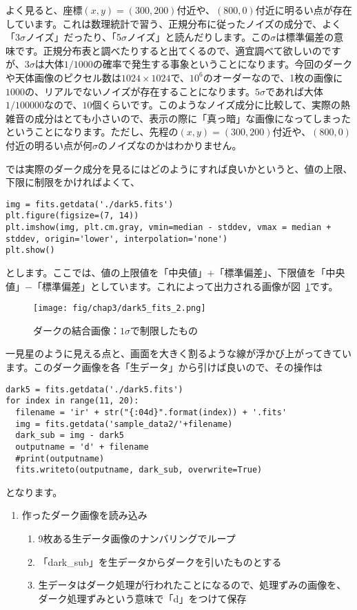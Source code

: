 よく見ると、座標$(x,y)=(300,200)$付近や、$(800,0)$付近に明るい点が存在しています。これは数理統計で習う、正規分布に従ったノイズの成分で、よく「3$\sigma$ノイズ」だったり、「5$\sigma$ノイズ」と読んだりします。この$\sigma$は標準偏差の意味です。正規分布表と調べたりすると出てくるので、適宜調べて欲しいのですが、3$\sigma$は大体$1/1000$の確率で発生する事象ということになります。今回のダークや天体画像のピクセル数は$1024\times1024$で、$10^{6}$のオーダーなので、1枚の画像に$1000$の、リアルでないノイズが存在することになります。$5\sigma$であれば大体$1/100000$なので、$10$個くらいです。このようなノイズ成分に比較して、実際の熱雑音の成分はとても小さいので、表示の際に「真っ暗」な画像になってしまったということになります。ただし、先程の$(x,y)=(300,200)$付近や、$(800,0)$付近の明るい点が何$\sigma$のノイズなのかはわかりません。

では実際のダーク成分を見るにはどのようにすれば良いかというと、値の上限、下限に制限をかければよくて、
\begin{lstlisting}[caption=実際のダーク画像の出力,label=code_3_3_4]
img = fits.getdata('./dark5.fits')
plt.figure(figsize=(7, 14))
plt.imshow(img, plt.cm.gray, vmin=median - stddev, vmax = median + stddev, origin='lower', interpolation='none')
plt.show()
\end{lstlisting}
とします。ここでは、値の上限値を「中央値」$+$「標準偏差」、下限値を「中央値」$-$「標準偏差」としています。これによって出力される画像が図~\ref{fig_3_2}です。
\begin{figure}
  \centering
	\texttt{[image: fig/chap3/dark5\_fits\_2.png]}
	\caption[ダークの結合画像：$1\sigma$で制限したもの]{ダークの結合画像：$1\sigma$で制限したもの\label{fig_3_2}}
\end{figure}

一見星のように見える点と、画面を大きく割るような線が浮かび上がってきています。このダーク画像を各「生データ」から引けば良いので、その操作は
\begin{lstlisting}[caption=生データからダークを引く処理,label=code_3_3_5]
dark5 = fits.getdata('./dark5.fits')
for index in range(11, 20):
  filename = 'ir' + str("{:04d}".format(index)) + '.fits'
  img = fits.getdata('sample_data2/'+filename)
  dark_sub = img - dark5
  outputname = 'd' + filename
  #print(outputname)
  fits.writeto(outputname, dark_sub, overwrite=True)
\end{lstlisting}
となります。
\begin{enumerate}[(1)]
  \item 作ったダーク画像を読み込み
  \begin{enumerate}
    \item 9枚ある生データ画像のナンバリングでループ
    \item 「dark\_sub」を生データからダークを引いたものとする
    \item 生データはダーク処理が行われたことになるので、処理ずみの画像を、ダーク処理ずみという意味で「d」をつけて保存
  \end{enumerate}
\end{enumerate}

